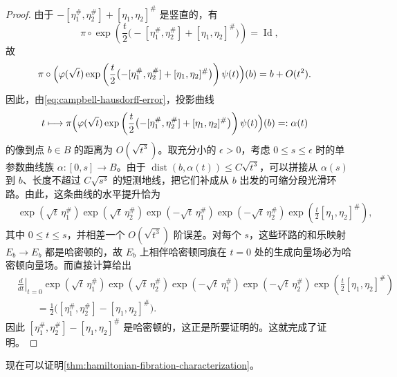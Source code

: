 \begin{proof}
由于 $-[\eta_1^\#,\eta_2^\#]+[\eta_1,\eta_2]^\#$ 是竖直的，有
\[
 \pi\circ\exp\left(\frac t2
  \bigl(-[\eta_1^\#,\eta_2^\#]+[\eta_1,\eta_2]^\#\bigr)\right)
 =\operatorname{Id},
\]
故
\[
\begin{aligned}
 \pi\circ\Bigl(&\varphi(\sqrt t)
  \exp\left(\frac t2
   \bigl(-[\eta_1^\#,\eta_2^\#]+[\eta_1,\eta_2]^\#\bigr)\right)
  \psi(t)\Bigr)(b)
 =b+O(t^2).
\end{aligned}
\]
因此，由\eqref{eq:campbell-hausdorff-error}，投影曲线
\[
\begin{aligned}
 t\longmapsto\pi\Bigl(&\varphi(\sqrt t)
  \exp\left(\frac t2
   \bigl(-[\eta_1^\#,\eta_2^\#]+[\eta_1,\eta_2]^\#\bigr)\right)
  \psi(t)\Bigr)(b)=:\alpha(t)
\end{aligned}
\]
的像到点 $b\in B$ 的距离为 $O(\sqrt{t^3})$。取充分小的
$\epsilon>0$，考虑 $0\leq s\leq\epsilon$ 时的单参数曲线族
$\alpha:[0,s]\to B$。由于
$\operatorname{dist}(b,\alpha(t))\leq C\sqrt{t^3}$，可以拼接从
$\alpha(s)$ 到 $b$、长度不超过 $C\sqrt{s^3}$ 的短测地线，把它们补成从
$b$ 出发的可缩分段光滑环路。由此，这条曲线的水平提升恰为
\[
\begin{aligned}
 &\exp(\sqrt t\,\eta_1^\#)
  \exp(\sqrt t\,\eta_2^\#)
  \exp(-\sqrt t\,\eta_1^\#)
  \exp(-\sqrt t\,\eta_2^\#)
  \exp\left(\frac t2[\eta_1,\eta_2]^\#\right),
\end{aligned}
\]
其中 $0\leq t\leq s$，并相差一个 $O(\sqrt{t^3})$ 阶误差。对每个
$s$，这些环路的和乐映射 $E_b\to E_b$ 都是哈密顿的，故 $E_b$ 上相伴哈密顿同痕在 $t=0$ 处的生成向量场必为哈密顿向量场。而直接计算给出
\[
\begin{aligned}
 &\left.\frac d{dt}\right|_{t=0}
  \exp(\sqrt t\,\eta_1^\#)
  \exp(\sqrt t\,\eta_2^\#)
  \exp(-\sqrt t\,\eta_1^\#)
  \exp(-\sqrt t\,\eta_2^\#)
  \exp\left(\frac t2[\eta_1,\eta_2]^\#\right)\\
 &\qquad=\frac12\bigl([\eta_1^\#,\eta_2^\#]-[\eta_1,\eta_2]^\#\bigr).
\end{aligned}
\]
因此 $[\eta_1^\#,\eta_2^\#]-[\eta_1,\eta_2]^\#$ 是哈密顿的，这正是所要证明的。这就完成了证明。
\end{proof}

现在可以证明\cref{thm:hamiltonian-fibration-characterization}。

